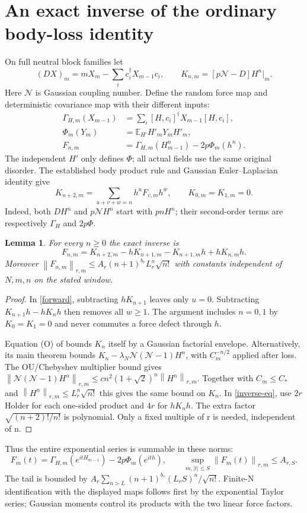 \documentclass[11pt]{article}
\newcommand{\E}{\mathbb E}
\newcommand{\Nc}{\mathcal N}
\newcommand{\norm}[1]{\left\lVert#1\right\rVert}
\newtheorem{lemma}{Lemma}
\begin{document}
\newpage
\section{An exact inverse of the ordinary body-loss identity}
On full neutral block families let
\[
 (DX)_m=mX_m-\sum_i c_i^\dagger X_{m-1}c_i,
 \qquad K_{n,m}=[p\Nc-D]H^n\big|_m.
\]
Here $\Nc$ is Gaussian coupling number. Define the random force
map and deterministic covariance map with their different inputs:
\begin{align*}
 \Gamma_{H,m}(X_{m-1})
   &=\sum_i[H,c_i]^\dagger X_{m-1}[H,c_i],\\
 \Phi_m(Y_m)&=\E_{H'}H'_mY_mH'_m,\\
 F_{n,m}&=\Gamma_{H,m}(H_{m-1}^n)-2p\Phi_m(h^n).
\end{align*}
The independent $H'$ only defines $\Phi$; all actual fields
use the same original disorder. The established body product rule
and Gaussian Euler--Laplacian identity \cite{operator,gradient} give
\begin{equation}\label{forward}
 K_{n+2,m}=\sum_{u+v+w=n}h^u F_{v,m}h^w,
 \qquad K_{0,m}=K_{1,m}=0.
\end{equation}
Indeed, both $DH^n$ and $p\Nc H^n$ start with $pnH^n$;
their second-order terms are respectively $\Gamma_H$ and $2p\Phi$.
\begin{lemma}\label{inverse}
For every $n\ge0$ the exact inverse is
\begin{equation}\label{inverse-eq}
 F_{n,m}=K_{n+2,m}-hK_{n+1,m}-K_{n+1,m}h+hK_{n,m}h.
\end{equation}
Moreover $\norm{F_{n,m}}_{r,m}\le A_r(n+1)^{b_r}L_r^n\sqrt{n!}$
with constants independent of $N,m,n$ on the stated window.
\end{lemma}
\begin{proof}
In \eqref{forward}, subtracting $hK_{n+1}$ leaves only $u=0$.
Subtracting $K_{n+1}h-hK_nh$ then removes all $w\ge1$.
The argument includes $n=0,1$ by $K_0=K_1=0$ and never
commutes a force defect through $h$.

Equation (O) of \cite{gradient} bounds $K_n$ itself by a Gaussian
factorial envelope. Alternatively, its main theorem bounds
$K_n-\lambda_N\Nc(\Nc-1)H^n$, with $C_m^{-n/2}$ applied after
loss. The OU/Chebyshev multiplier bound \cite{operator} gives
$\norm{\Nc(\Nc-1)H^n}_{r,m}\le c n^2(1+\sqrt2)^n
\norm{H^n}_{r,m}$. Together with $C_m\le C_*$ and
$\norm{H^n}_{r,m}\le L_r^n\sqrt{n!}$ this gives the same bound
on $K_n$. In \eqref{inverse-eq}, use $2r$ Holder for each one-sided
product and $4r$ for $hK_nh$. The extra factor
$\sqrt{(n+2)!/n!}$ is polynomial. Only a fixed multiple of r is
needed, independent of n.
\end{proof}
Thus the entire exponential series is summable in these norms:
\begin{equation}\label{force-time}
 F_m(t)=\Gamma_{H,m}(e^{itH_{m-1}})-2p\Phi_m(e^{ith}),
 \qquad \sup_{m,|t|\le S}\norm{F_m(t)}_{r,m}\le A_{r,S}.
\end{equation}
The tail is bounded by $A_r\sum_{n>L}(n+1)^{b_r}
(L_rS)^n/\sqrt{n!}$. Finite-N identification with the displayed
maps follows first by the exponential Taylor series; Gaussian
moments control its products with the two linear force factors.
\end{document}
